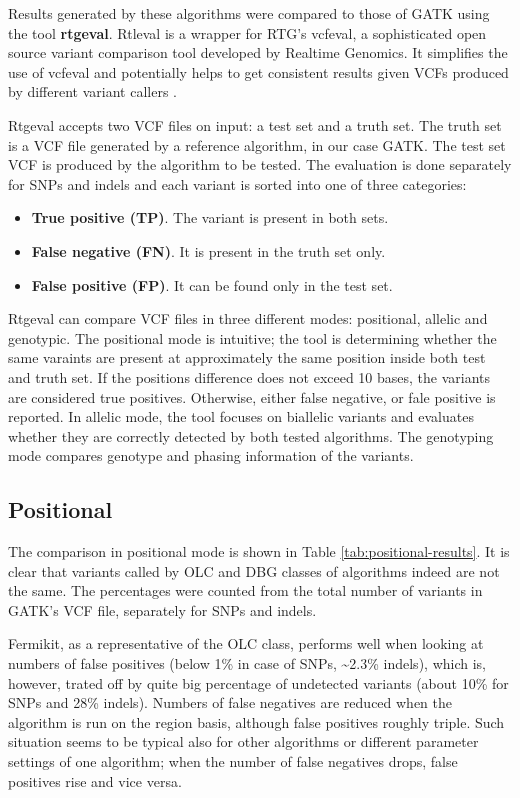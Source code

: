Results generated by these algorithms were compared to those of GATK using the tool\textbf{ rtgeval}. Rtleval is a wrapper for RTG's vcfeval, a sophisticated open source variant comparison tool developed by Realtime Genomics. It simplifies the use of vcfeval and potentially helps to get consistent results given VCFs produced by different variant callers \cite{rtgeval}.

Rtgeval accepts two VCF files on input: a test set and a truth set. The truth set is a VCF file generated by a reference algorithm, in our case GATK. The test set VCF is produced by the algorithm to be tested. The evaluation is done separately for SNPs and indels and each variant is sorted into one of three categories:
\begin{itemize}
\item \textbf{True positive (TP)}. The variant is present in both sets.
\item \textbf{False negative (FN)}. It is present in the truth set only.
\item \textbf{False positive (FP)}. It can be found only in the test set.
\end{itemize}

Rtgeval can compare VCF files in three different modes: positional, allelic and genotypic. The positional mode is intuitive; the tool is determining whether the same varaints are present at approximately the same position inside both test and truth set. If the positions difference does not exceed 10 bases, the variants are considered true positives. Otherwise, either false negative, or fale positive is reported. In allelic mode, the tool focuses on biallelic variants and evaluates whether they are correctly detected by both tested algorithms. The genotyping mode compares genotype and phasing information of the variants.

\subsection{Positional}
\label{subsec:positional-results}

The comparison in positional mode is shown in Table \ref{tab:positional-results}. It is clear that variants called by OLC and DBG classes of algorithms indeed are not the same. The percentages were counted from the total number of variants in GATK's VCF file, separately for SNPs and indels.

Fermikit, as a representative of the OLC class, performs well when looking at numbers of false positives (below 1\% in case of SNPs, \textasciitilde 2.3\% indels), which is, however, trated off by quite  big percentage of undetected variants (about 10\% for SNPs and 28\% indels). Numbers of false negatives are reduced when the algorithm is run on the region basis, although false positives roughly triple. Such situation seems to be typical also for other algorithms or different parameter settings of one algorithm; when the number of false negatives drops, false positives rise and vice versa.


